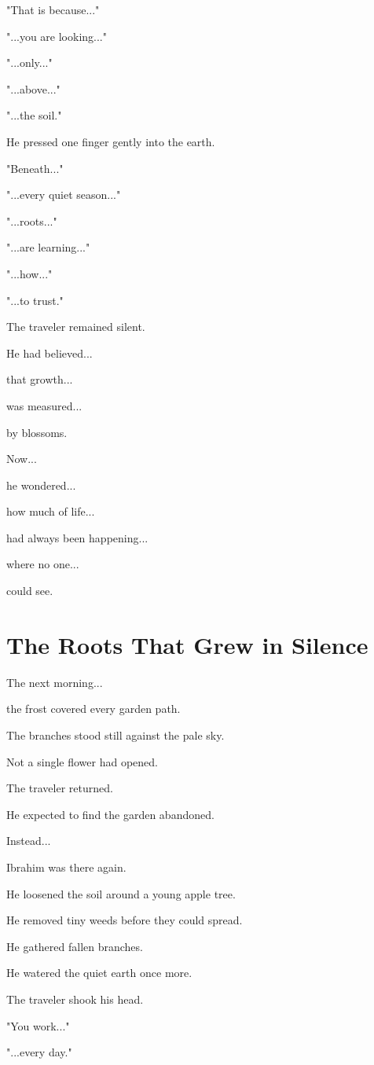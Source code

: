 \documentclass[12pt,openany]{book}
\begin{document}
"That is because..."

"...you are looking..."

"...only..."

"...above..."

"...the soil."

He pressed one finger gently into the earth.

"Beneath..."

"...every quiet season..."

"...roots..."

"...are learning..."

"...how..."

"...to trust."

The traveler remained silent.

He had believed...

that growth...

was measured...

by blossoms.

Now...

he wondered...

how much of life...

had always been happening...

where no one...

could see.
\section*{The Roots That Grew in Silence}

The next morning...

the frost covered every garden path.

The branches stood still against the pale sky.

Not a single flower had opened.

The traveler returned.

He expected to find the garden abandoned.

Instead...

Ibrahim was there again.

He loosened the soil around a young apple tree.

He removed tiny weeds before they could spread.

He gathered fallen branches.

He watered the quiet earth once more.

The traveler shook his head.

"You work..."

"...every day."
\end{document}
